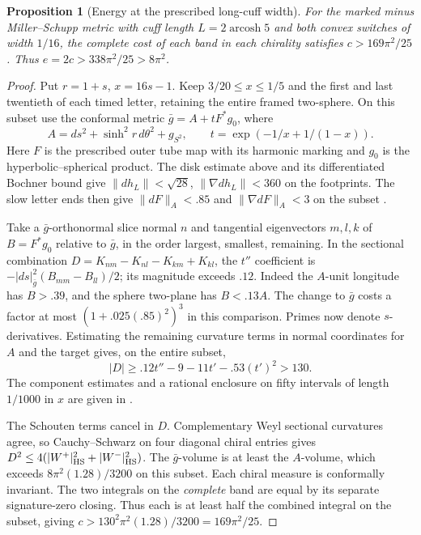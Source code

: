 \documentclass[11pt,letterpaper]{article}
\numberwithin{equation}{section}
\newtheorem{proposition}[theorem]{Proposition}
\begin{document}
\begin{proposition}[Energy at the prescribed long-cuff width]
\label{prop:long-cuff-cost}
For the marked minus Miller--Schupp metric with cuff length
\(L=2\operatorname{arcosh}5\) and both convex switches of width
\(1/16\), the complete cost of each band in each chirality satisfies
\(c>169\pi^2/25\). Thus \(e=2c>338\pi^2/25>8\pi^2\).
\end{proposition}
\begin{proof}
Put \(r=1+s\), \(x=16s-1\). Keep \(3/20\le x\le1/5\) and the first
and last twentieth of each timed letter, retaining the entire framed
two-sphere. On this subset use the conformal metric
\(\bar g=A+tF^*g_0\), where
\[
 A=ds^2+\sinh^2r\,d\theta^2+g_{S^2},\qquad
 t=\exp(-1/x+1/(1-x)).
\]
Here \(F\) is the prescribed outer tube map with its harmonic marking
and \(g_0\) is the hyperbolic--spherical product. The disk estimate
above and its differentiated Bochner bound give
\(\|dh_L\|<\sqrt{28}\), \(\|\nabla dh_L\|<360\) on the footprints.
The slow letter ends then give \(\|dF\|_A<.85\) and
\(\|\nabla dF\|_A<3\) on the subset
\cite{Baker2026LongCuffWidth}.

Take a \(\bar g\)-orthonormal slice normal \(n\) and tangential
eigenvectors \(m,l,k\) of \(B=F^*g_0\) relative to \(\bar g\), in
the order largest, smallest, remaining. In the sectional combination
\(D=K_{nm}-K_{nl}-K_{km}+K_{kl}\), the \(t''\) coefficient is
\(-|ds|^2_{\bar g}(B_{mm}-B_{ll})/2\); its magnitude exceeds \(.12\).
Indeed the \(A\)-unit longitude has \(B>.39\), and the sphere
two-plane has \(B<.13 A\). The change to \(\bar g\) costs a factor
at most \((1+.025(.85)^2)^3\) in this comparison. Primes now denote
\(s\)-derivatives. Estimating the remaining curvature terms in normal
coordinates for \(A\) and the target gives, on the entire subset,
\[
 |D|\ge .12t''-9-11t'-.53(t')^2>130 .
\]
The component estimates and a rational enclosure on fifty intervals
of length \(1/1000\) in \(x\) are given in
\cite{Baker2026LongCuffWidth}.

The Schouten terms cancel in \(D\). Complementary Weyl sectional
curvatures agree, so Cauchy--Schwarz on four diagonal chiral entries
gives \(D^2\le4(|W^+|_{\rm HS}^2+|W^-|_{\rm HS}^2)\).
The \(\bar g\)-volume is at least the \(A\)-volume, which exceeds
\(8\pi^2(1.28)/3200\) on this subset. Each chiral measure is
conformally invariant. The two integrals on the \emph{complete} band
are equal by its separate signature-zero closing. Thus each is at
least half the combined integral on the subset, giving
\(c>130^2\pi^2(1.28)/3200=169\pi^2/25\).
\end{proof}
\end{document}
